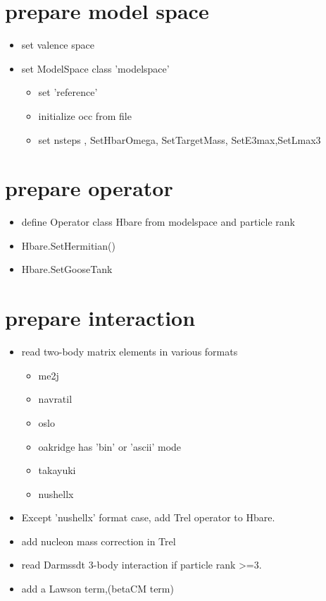 \section{prepare model space}
\begin{itemize}
  \item set valence space
  \item set ModelSpace class 'modelspace'
  \begin{itemize}
    \item set 'reference'
    \item initialize occ from file 
    \item set nsteps , SetHbarOmega, SetTargetMass, SetE3max,SetLmax3
  \end{itemize} 	
\end{itemize}		
\section{prepare operator}
\begin{itemize}
  \item define Operator class Hbare from modelspace and particle rank
  \item Hbare.SetHermitian() 
  \item Hbare.SetGooseTank
\end{itemize} 

\section{prepare interaction}
\begin{itemize}
  \item read two-body matrix elements in various formats 
  \begin{itemize}
    \item me2j 
    \item navratil
    \item oslo 
    \item oakridge has 'bin' or 'ascii' mode 
    \item takayuki 
    \item nushellx     
  \end{itemize}
  \item Except 'nushellx' format case, add Trel operator to Hbare.
  \item add nucleon mass correction in Trel 
  \item read Darmssdt 3-body interaction if particle rank >=3. 
  \item add a Lawson term,(betaCM term) 
\end{itemize}
